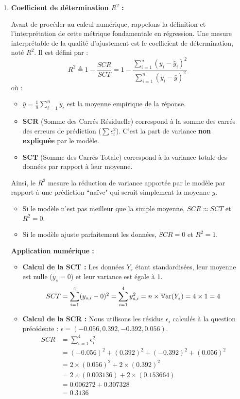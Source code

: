 \documentclass[solutions]{../exercices}
\begin{document}
\begin{solution}
\begin{enumerate}
		\item \textbf{Coefficient de détermination $R^2$ :}

		Avant de procéder au calcul numérique, rappelons la définition et l'interprétation de cette métrique fondamentale en régression.
		Une mesure interprétable de la qualité d'ajustement est le coefficient de détermination, noté $R^2$. Il est défini par :
		\begin{equation}
			R^2 \triangleq 1 - \frac{SCR}{SCT} = 1 - \frac{\sum_{i=1}^n (y_i - \hat{y}_i)^2}{\sum_{i=1}^n (y_i - \bar{y})^2}
		\end{equation}
		où :
		\begin{itemize}
			\item $\bar{y} = \frac{1}{n} \sum_{i=1}^n y_i$ est la moyenne empirique de la réponse.
			\item $\mathbf{SCR}$ (Somme des Carrés Résiduelle) correspond à la somme des carrés des erreurs de prédiction ($\sum \epsilon_i^2$). C'est la part de variance \textbf{non expliquée} par le modèle.
			\item $\mathbf{SCT}$ (Somme des Carrés Totale) correspond à la variance totale des données par rapport à leur moyenne.
		\end{itemize}
		Ainsi, le $R^2$ mesure la réduction de variance apportée par le modèle par rapport à une prédiction ``naïve" qui serait simplement la moyenne $\bar{y}$. 
		\begin{itemize}
			\item Si le modèle n'est pas meilleur que la simple moyenne, $SCR \approx SCT$ et $R^2 = 0$.
			\item Si le modèle ajuste parfaitement les données, $SCR = 0$ et $R^2 = 1$.
		\end{itemize}

		\textbf{Application numérique :}
		\begin{itemize}
			\item \textbf{Calcul de la SCT :}
			Les données $Y_s$ étant standardisées, leur moyenne est nulle ($\bar{y}_s = 0$) et leur variance est égale à 1.
			\[ SCT = \sum_{i=1}^4 (y_{s,i} - 0)^2 = \sum_{i=1}^4 y_{s,i}^2 = n \times \mathbb{V}\mathrm{ar}(Y_s) = 4 \times 1 = 4 \]

			\item \textbf{Calcul de la SCR :}
			Nous utilisons les résidus $\epsilon_i$ calculés à la question précédente : $\epsilon = (-0.056, 0.392, -0.392, 0.056)$.
			\[
			\begin{aligned}
				SCR &= \sum_{i=1}^4 \epsilon_i^2 \\
				&= (-0.056)^2 + (0.392)^2 + (-0.392)^2 + (0.056)^2 \\
				&= 2 \times (0.056)^2 + 2 \times (0.392)^2 \\
				&= 2 \times (0.003136) + 2 \times (0.153664) \\
				&= 0.006272 + 0.307328 \\
				&= 0.3136
			\end{aligned}
			\]


\end{itemize}
\end{enumerate}
\end{solution}
\end{document}
